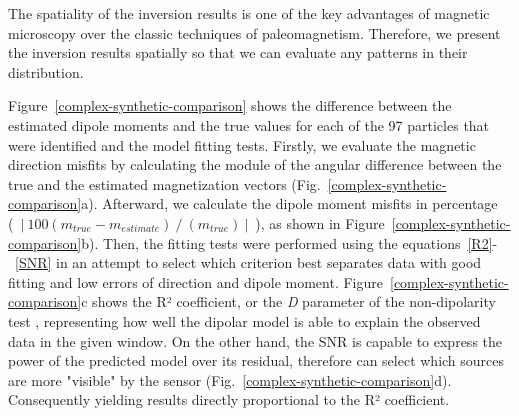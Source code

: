 The spatiality of the inversion results is one of the key advantages of magnetic microscopy over the classic techniques of paleomagnetism. Therefore, we present the inversion results spatially so that we can evaluate any patterns in their distribution.

Figure~\ref{complex-synthetic-comparison} shows the difference between the estimated dipole moments and the true values for each of the 97 particles that were identified and the model fitting tests. Firstly, we evaluate the magnetic direction misfits by calculating the module of the angular difference between the true and the estimated magnetization vectors (Fig.~\ref{complex-synthetic-comparison}a). Afterward, we calculate the dipole moment misfits in percentage (~$|~100 \left( m_{true} - m_{estimate}\right)~/~\left(m_{true}\right)~|$~), as shown in Figure~\ref{complex-synthetic-comparison}b). Then, the fitting tests were performed using the equations~\ref{R2}-~\ref{SNR} in an attempt to select which criterion best separates data with good fitting and low errors of direction and dipole moment. Figure~\ref{complex-synthetic-comparison}c shows the R² coefficient, or the \emph{D} parameter of the non-dipolarity test \citep{Fu2020}, representing how well the dipolar model is able to explain the observed data in the given window. On the other hand, the SNR is capable to express the power of the predicted model over its residual, therefore can select which sources are more "visible" by the sensor (Fig.~\ref{complex-synthetic-comparison}d). Consequently yielding results directly proportional to the R² coefficient. 


